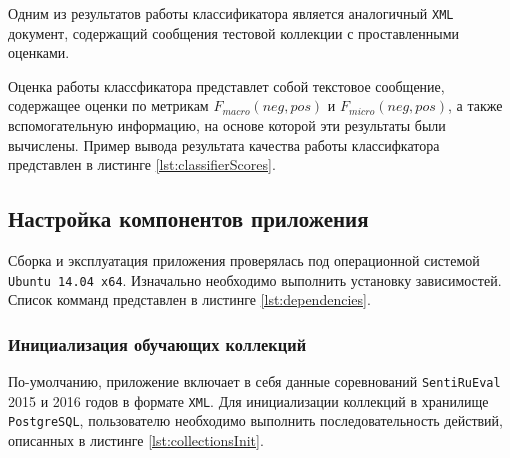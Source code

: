 
    Одним из результатов работы классификатора является аналогичный {\tt XML}
    документ, содержащий сообщения тестовой коллекции с проставленными оценками.


    Оценка работы классфикатора представлет собой текстовое сообщение,
    содержащее оценки по метрикам  $F_{macro}(neg, pos)$ и $F_{micro}(neg, pos)$,
    а также вспомогательную информацию, на основе которой эти результаты были
    вычислены. Пример вывода результата качества работы классифкатора представлен
    в листинге \ref{lst:classifierScores}.
    \lstset{style=xml}
    

    \subsection{Настройка компонентов приложения}
    Сборка и эксплуатация приложения проверялась под операционной системой
    {\tt Ubuntu 14.04 x64}. Изначально необходимо выполнить установку зависимостей.
    Список комманд представлен в листинге \ref{lst:dependencies}.
    \lstset{style=bash}
    

    \subsubsection{Инициализация обучающих коллекций}
        По-умолчанию, приложение включает в себя данные соревнований {\tt SentiRuEval}
        2015 и 2016 годов в формате {\tt XML}. Для инициализации коллекций в хранилище
        {\tt PostgreSQL}, пользователю необходимо выполнить последовательность
        действий, описанных в листинге \ref{lst:collectionsInit}.
        \lstset{style=bash}
        

